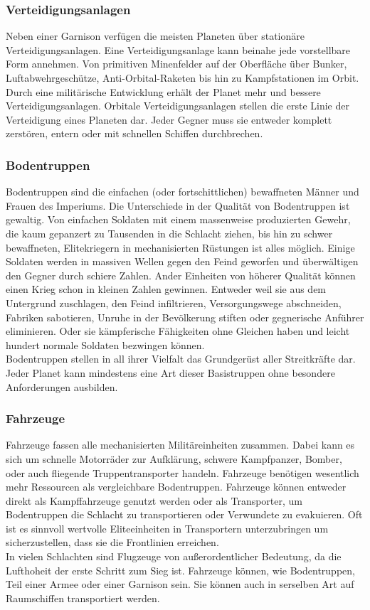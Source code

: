 \documentclass[11pt, a4paper]{article}
\begin{document}
\subsubsection{Verteidigungsanlagen}
Neben einer Garnison verfügen die meisten Planeten über stationäre Verteidigungsanlagen. Eine
Verteidigungsanlage kann beinahe jede vorstellbare Form annehmen. Von primitiven Minenfelder auf der
Oberfläche über Bunker, Luftabwehrgeschütze, Anti-Orbital-Raketen bis hin zu Kampfstationen im Orbit.
Durch eine militärische Entwicklung erhält der Planet mehr und bessere Verteidigungsanlagen.
Orbitale Verteidigungsanlagen stellen die erste Linie der Verteidigung eines Planeten dar. Jeder Gegner muss
sie entweder komplett zerstören, entern oder mit schnellen Schiffen durchbrechen.
%
\subsubsection{Bodentruppen}
Bodentruppen sind die einfachen (oder fortschittlichen) bewaffneten Männer und Frauen des Imperiums.
Die Unterschiede in der Qualität von Bodentruppen ist gewaltig. Von einfachen Soldaten mit einem massenweise
produzierten Gewehr, die kaum gepanzert zu Tausenden in die Schlacht ziehen, bis hin zu schwer bewaffneten,
Elitekriegern in mechanisierten Rüstungen ist alles möglich. Einige Soldaten werden in massiven Wellen gegen
den Feind geworfen und überwältigen den Gegner durch schiere Zahlen. Ander Einheiten von höherer Qualität
können einen Krieg schon in kleinen Zahlen gewinnen. Entweder weil sie aus dem Untergrund zuschlagen, den
Feind infiltrieren, Versorgungswege abschneiden, Fabriken sabotieren, Unruhe in der Bevölkerung stiften oder
gegnerische Anführer eliminieren. Oder sie kämpferische Fähigkeiten ohne Gleichen haben und leicht hundert
normale Soldaten bezwingen können.\\
Bodentruppen stellen in all ihrer Vielfalt das Grundgerüst aller Streitkräfte dar. Jeder Planet kann
mindestens eine Art dieser Basistruppen ohne besondere Anforderungen ausbilden.
%
\subsubsection{Fahrzeuge}
Fahrzeuge fassen alle mechanisierten Militäreinheiten zusammen. Dabei kann es sich um schnelle Motorräder zur
Aufklärung, schwere Kampfpanzer, Bomber, oder auch fliegende Truppentransporter handeln. Fahrzeuge benötigen
wesentlich mehr Ressourcen als vergleichbare Bodentruppen. Fahrzeuge können entweder direkt als Kampffahrzeuge
genutzt werden oder als Transporter, um Bodentruppen die Schlacht zu transportieren oder Verwundete zu
evakuieren. Oft ist es sinnvoll wertvolle Eliteeinheiten in Transportern unterzubringen um sicherzustellen,
dass sie die Frontlinien erreichen.\\
In vielen Schlachten sind Flugzeuge von außerordentlicher Bedeutung, da die Lufthoheit der erste Schritt zum
Sieg ist. Fahrzeuge können, wie Bodentruppen, Teil einer Armee oder einer Garnison sein. Sie können auch in
serselben Art auf Raumschiffen transportiert werden.
%
\end{document}
